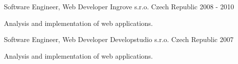 \begin{cventries}
\cventry
{Software Engineer, Web Developer} %
{Ingrove s.r.o.} %
{Czech Republic} %
{2008 - 2010} %
{
	\begin{cvitems} %
		\item {Analysis and implementation of web applications. %
		}
	\end{cvitems}
}

\cventry
{Software Engineer, Web Developer} %
{Developstudio s.r.o.} %
{Czech Republic} %
{2007} %
{
	\begin{cvitems} %
		\item {Analysis and implementation of web applications. %
		}
	\end{cvitems}
}

\end{cventries}
